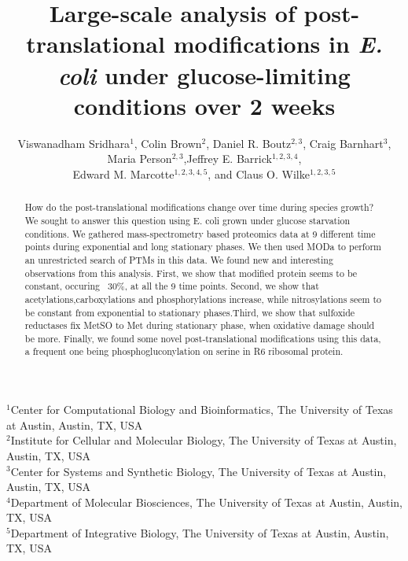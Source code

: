 \documentclass[12pt]{article}
\begin{document}
\title{Large-scale analysis of post-translational modifications in \emph{E. coli} under glucose-limiting conditions over 2 weeks}

\author{Viswanadham Sridhara$^1$, Colin Brown$^{2}$, Daniel R. Boutz$^{2,3}$, Craig Barnhart$^3$, Maria Person$^{2,3}$,Jeffrey E. Barrick$^{1,2,3,4}$,\\
Edward M. Marcotte$^{1,2,3,4,5}$, and Claus O. Wilke$^{1,2,3,5}$}
\maketitle

\noindent
$^1$Center for Computational Biology and Bioinformatics, The University of Texas at Austin, Austin, TX, USA\\
$^2$Institute for Cellular and Molecular Biology, The University of Texas at Austin, Austin, TX, USA\\
$^3$Center for Systems and Synthetic Biology, The University of Texas at Austin, Austin, TX, USA\\
$^4$Department of Molecular Biosciences, The University of Texas at Austin, Austin, TX, USA\\
$^5$Department of Integrative Biology, The University of Texas at Austin, Austin, TX, USA\\


\begin{abstract}
How do the post-translational modifications change over time during species growth? We sought to answer this question using E. coli grown under glucose starvation conditions. We gathered mass-spectrometry based proteomics data at 9 different time points during exponential and long stationary phases. We then used MODa to perform an unrestricted search of PTMs in this data. We found new and interesting observations from this analysis. First, we show that modified protein seems to be constant, occuring ~30\%, at all the 9 time points. Second, we show that acetylations,carboxylations and phosphorylations increase, while nitrosylations seem to be constant from exponential to stationary phases.Third, we show that sulfoxide reductases fix MetSO to Met during stationary phase, when oxidative damage should be more. Finally, we found some novel post-translational modifications using this data, a frequent one being phosphogluconylation on serine in R6 ribosomal protein.
\end{abstract}

\end{document}
